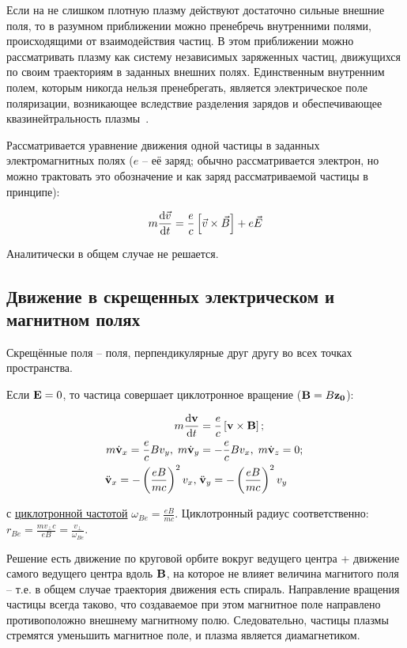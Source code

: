 \documentclass[10pt, a4paper]{article}
\begin{document}
Если на не слишком плотную плазму действуют достаточно сильные внешние поля, то в разумном приближении можно пренебречь внутренними полями, происходящими от взаимодействия частиц. В этом приближении можно рассматривать плазму как систему независимых заряженных частиц, движущихся по своим траекториям в заданных внешних полях. Единственным внутренним полем, которым никогда нельзя пренебрегать, является электрическое поле поляризации, возникающее вследствие разделения зарядов и обеспечивающее квазинейтральность плазмы~\cite{frank}.

Рассматривается уравнение движения одной частицы в заданных электромагнитных полях ($e$ -- её заряд; обычно рассматривается электрон, но можно трактовать это обозначение и как заряд рассматриваемой частицы в принципе):

\begin{equation} \label{eq:motion_eq}
	m\dv{\vec{v}}{t} = \frac{e}{c}\left[\vec{v}\times\vec{B}\right]+e\vec{E}
\end{equation}

Аналитически в общем случае не решается.

\subsection{Движение в скрещенных электрическом и магнитном полях}

Скрещённые поля -- поля, перпендикулярные друг другу во всех точках пространства.

Если $\vb{E}=0$, то частица совершает циклотронное вращение ($\vb{B}=B\vb{z_0}$):

\begin{align*}
	m\dv{\vb{v}}{t} &= \frac{e}{c}\left[\vb{v}\times\vb{B}\right];\\
	m\dot{\vb{v}}_x = \frac{e}{c}Bv_y,\;m\dot{\vb{v}}_y &= -\frac{e}{c}Bv_x,\;  m\dot{\vb{v}}_z = 0;\;\\
	\ddot{\vb{v}}_x = -\left(\frac{eB}{mc}\right)^2v_x,\;&\ddot{\vb{v}}_y = -\left(\frac{eB}{mc}\right)^2v_y
\end{align*}

с \uline{циклотронной частотой} $\omega_{Be}=\frac{eB}{mc}$. Циклотронный радиус соответственно: $r_{Be} = \frac{mv_\perp c}{eB}=\frac{v_\perp}{\omega_{Be}}$.

Решение есть движение по круговой орбите вокруг ведущего центра + движение самого ведущего центра вдоль $\vb{B}$, на которое не влияет величина магнитого поля -- т.е. в общем случае траектория движения есть спираль. Направление вращения частицы всегда таково, что создаваемое при этом магнитное поле направлено противоположно внешнему магнитному полю. Следовательно, частицы плазмы стремятся уменьшить магнитное поле, и плазма является диамагнетиком.
\end{document}
